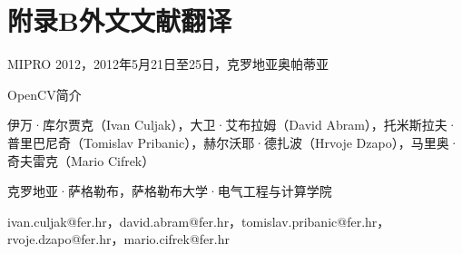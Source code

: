\documentclass{bjtu-bachelor-thesis}
\begin{document}
\section*{附录B\hspace{1em}外文文献翻译}

MIPRO 2012，2012年5月21日至25日，克罗地亚奥帕蒂亚
\begin{center}
    OpenCV简介\par
伊万·库尔贾克（Ivan Culjak），大卫·艾布拉姆（David Abram），托米斯拉夫·普里巴尼奇（Tomislav Pribanic），赫尔沃耶·德扎波（Hrvoje Dzapo），马里奥·奇夫雷克（Mario Cifrek）\par
克罗地亚·萨格勒布，萨格勒布大学·电气工程与计算学院\par
ivan.culjak@fer.hr，david.abram@fer.hr，tomislav.pribanic@fer.hr，rvoje.dzapo@fer.hr，mario.cifrek@fer.hr\par
\end{center}
\end{document}
